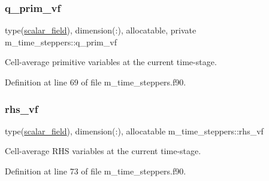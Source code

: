 \subsubsection{\texorpdfstring{q\+\_\+prim\+\_\+vf}{q\_prim\_vf}}
{\footnotesize\ttfamily type(\hyperlink{structm__derived__types_1_1scalar__field}{scalar\+\_\+field}), dimension(\+:), allocatable, private m\+\_\+time\+\_\+steppers\+::q\+\_\+prim\+\_\+vf\hspace{0.3cm}{\ttfamily [private]}}



Cell-\/average primitive variables at the current time-\/stage. 



Definition at line 69 of file m\+\_\+time\+\_\+steppers.\+f90.

\mbox{\label{namespacem__time__steppers_a3d0867c3c2572c712d2aed6d677e6fc2}} 
\subsubsection{\texorpdfstring{rhs\+\_\+vf}{rhs\_vf}}
{\footnotesize\ttfamily type(\hyperlink{structm__derived__types_1_1scalar__field}{scalar\+\_\+field}), dimension(\+:), allocatable m\+\_\+time\+\_\+steppers\+::rhs\+\_\+vf}



Cell-\/average R\+HS variables at the current time-\/stage. 



Definition at line 73 of file m\+\_\+time\+\_\+steppers.\+f90.

